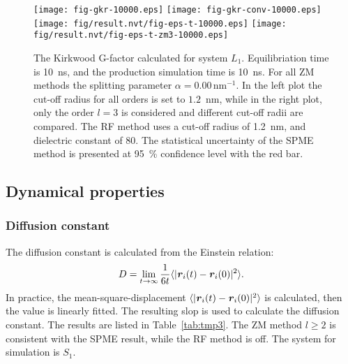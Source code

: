 \documentclass[aip,jcp,a4paper,reprint,unsortedaddress,onecolumn,fleqn]{revtex4-1}
\newcommand{\vect}[1]{\textbf{\textit{#1}}}
\newcommand{\systemsb}{S_1}
\newcommand{\systemlb}{L_1}
\begin{document}
\begin{figure}
  \centering
  \texttt{[image: fig-gkr-10000.eps]}
  \texttt{[image: fig-gkr-conv-10000.eps]}
  \texttt{[image: fig/result.nvt/fig-eps-t-10000.eps]}
  \texttt{[image: fig/result.nvt/fig-eps-t-zm3-10000.eps]}
  \caption{The Kirkwood G-factor calculated for system $\systemlb$. Equilibriation time is 10~ns, and the production simulation time is 10~ns.
    For all ZM methods the splitting parameter $\alpha = 0.00\,\textrm{nm}^{-1}$.
    In the left plot the cut-off radius for all orders is set to $1.2$~nm, while
    in the right plot, only the order $l=3$ is considered and different cut-off radii are compared.
    The RF method uses a cut-off radius of 1.2~nm, and dielectric constant of 80.
    The statistical uncertainty of the SPME method is presented at 95~\% confidence level with the red bar.
  }
  \label{fig:tmp3}
\end{figure}



\subsection{Dynamical properties}

\subsubsection{Diffusion constant}
The diffusion constant is calculated from the Einstein relation:
\begin{align}
  D = \lim_{t\rightarrow \infty}\frac {1}{6t} \langle \vert \vect r_i(t) - \vect r_i(0)\vert^2\rangle.
\end{align}
In practice, the mean-square-displacement $\langle\vert \vect r_i(t) - \vect
r_i(0)\vert^2\rangle$ is calculated, then the value is linearly fitted. The
resulting slop is used to calculate the diffusion constant. The results are listed in Table~\ref{tab:tmp3}.
The ZM method $l\geq 2$ is consistent with the SPME
result, while the RF method is off. The system for simulation is $\systemsb$.
\end{document}
